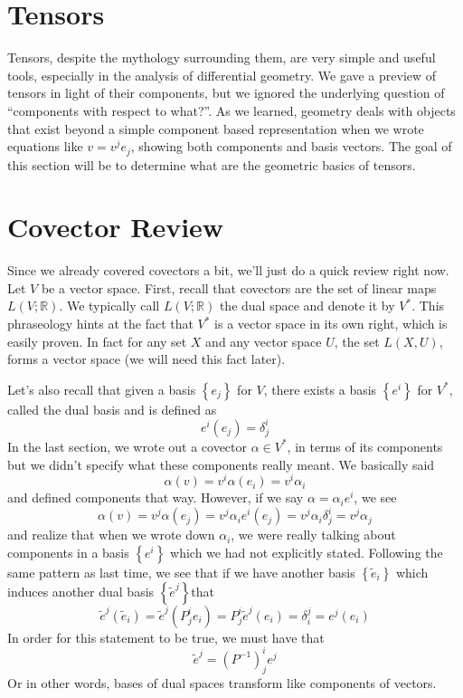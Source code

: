 \documentclass[a4paper]{article}
\begin{document}
\section*{Tensors}%
Tensors, despite the mythology surrounding them, are very simple and useful tools, especially in the analysis of differential geometry. We gave a preview of tensors in light of their components, but we ignored the underlying question of ``components with respect to what?''. As we learned, geometry deals with objects that exist beyond a simple component based representation when we wrote equations like $v = v^je_j$, showing both components and basis vectors. The goal of this section will be to determine what are the geometric basics of tensors.

\section*{Covector Review}%
Since we already covered covectors a bit, we'll just do a quick review right now. Let $V$ be a vector space. First, recall that covectors are the set of linear maps $L(V; \mathds{R})$. We typically call $L(V; \mathds{R})$ the dual space and denote it by $V^*$. This phraseology hints at the fact that $V^*$ is a vector space in its own right, which is easily proven. In fact for any set $X$ and any vector space $U$, the set $L(X,U)$, forms a vector space (we will need this fact later).

Let's also recall that given a basis $ \left\{ e_j \right\}$ for $V$, there exists a basis $ \left\{ e^i \right\}$ for $V^*$, called the dual basis and is defined as
\[
  e^i(e_j) = \delta_j^i
\]
In the last section, we wrote out a covector $\alpha \in V^*$, in terms of its components but we didn't specify what these components really meant. We basically said
\[
  \alpha(v) = v^i \alpha(e_i) = v^i \alpha_i
\]
and defined components that way. However, if we say $\alpha = \alpha_i e^i$, we see
\[
  \alpha(v) = v^j \alpha(e_j) = v^j \alpha_i e^i(e_j) =  v^j \alpha_i \delta_j^i = v^j\alpha_j
\]
and realize that when we wrote down $\alpha_i$, we were really talking about components in a basis $ \left\{ e^i \right\}$ which we had not explicitly stated. Following the same pattern as last time, we see that if we have another basis $ \left\{ \tilde{e}_i \right\}$ which induces another dual basis $ \left\{ \tilde{e}^j \right\}$that
\[
  \tilde{e}^j \left( \tilde{e}_i \right) =  \tilde{e}^j  \left( P_j^i e_i \right) = P_j^i \tilde{e}^j \left( e_i \right) = \delta_i^j = e^j (e_i)
\]
In order for this statement to be true, we must have that
\[
  \tilde{e}^j = (P^{-1})_j^i e^j
\]
Or in other words, bases of dual spaces transform like components of vectors.
\end{document}
